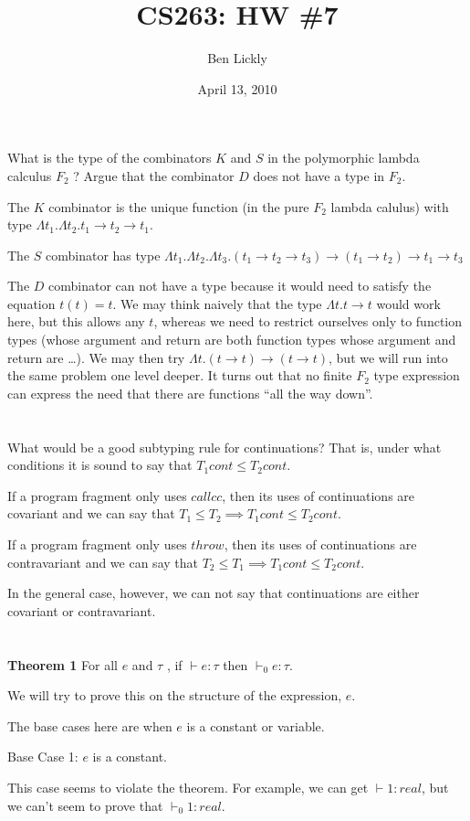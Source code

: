 \documentclass{article}
\title{CS263: HW \#7}
\author{Ben Lickly}
\date{April 13, 2010}
\newcommand{\problem}[1]
{\subsubsection*{} %
\vspace{-16pt} \section{} \vspace{-22pt} \qquad
#1%
\bigskip \bigskip
}
\newcommand{\proves}{\vdash}
\begin{document}
\maketitle

\problem{What is the type of the combinators $K$ and $S$ in the polymorphic
lambda calculus $F_2$ ? Argue that the combinator $D$ does not have a type in
$F_2$.
}

The $K$ combinator is the unique function (in the pure $F_2$
lambda calulus) with type
$\Lambda t_1. \Lambda t_2. t_1 \to t_2 \to t_1$.

The $S$ combinator has type
$\Lambda t_1. \Lambda t_2. \Lambda t_3.
(t_1 \to t_2 \to t_3) \to (t_1 \to t_2) \to t_1 \to t_3$

The $D$ combinator can not have a type because it would need to satisfy the
equation $t(t) = t$.  We may think naively that the type $\Lambda t. t \to t$
would work here, but this allows any $t$, whereas we need to restrict ourselves
only to function types (whose argument and return are both function types whose
argument and return are \dots).  We may then try
$\Lambda t. (t \to t) \to (t \to t)$, but we will run into the same problem one
level deeper.  It turns out that no finite $F_2$ type expression can express
the need that there are functions ``all the way down''.

\problem{What would be a good subtyping rule for continuations?  That is, under
what conditions it is sound to say that $T_1 cont \le T_2 cont$.
}

If a program fragment only uses $callcc$, then its uses of continuations are
covariant and we can say that $T_1 \le T_2 \implies T_1 cont \le T_2 cont$.

If a program fragment only uses $throw$, then its uses of continuations are
contravariant and we can say that $T_2 \le T_1 \implies T_1 cont \le T_2 cont$.

In the general case, however, we can not say that continuations are either
covariant or contravariant.

\problem{
{\bf Theorem 1} For all $e$ and $\tau$ , if $\proves e:\tau$ then
$\proves_0 e:\tau$.
}

We will try to prove this on the structure of the expression, $e$.

The base cases here are when $e$ is a constant or variable.

Base Case 1:  $e$ is a constant.

This case seems to violate the theorem.  For example, we can get
$\proves 1 : real$, but we can't seem to prove that $\proves_0 1 : real$.
\end{document}
